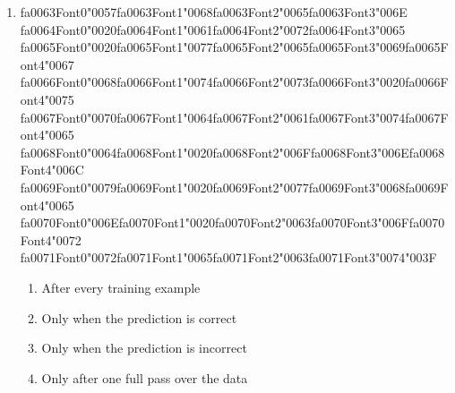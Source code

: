 \documentclass[12pt]{article}
\begin{document}
\begin{enumerate}[label=Q\arabic*.]
\item {\csname fa0063Font0\endcsname\char"0057}{\csname fa0063Font1\endcsname\char"0068}{\csname fa0063Font2\endcsname\char"0065}{\csname fa0063Font3\endcsname\char"006E} {\csname fa0064Font0\endcsname\char"0020}{\csname fa0064Font1\endcsname\char"0061}{\csname fa0064Font2\endcsname\char"0072}{\csname fa0064Font3\endcsname\char"0065} {\csname fa0065Font0\endcsname\char"0020}{\csname fa0065Font1\endcsname\char"0077}{\csname fa0065Font2\endcsname\char"0065}{\csname fa0065Font3\endcsname\char"0069}{\csname fa0065Font4\endcsname\char"0067} {\csname fa0066Font0\endcsname\char"0068}{\csname fa0066Font1\endcsname\char"0074}{\csname fa0066Font2\endcsname\char"0073}{\csname fa0066Font3\endcsname\char"0020}{\csname fa0066Font4\endcsname\char"0075} {\csname fa0067Font0\endcsname\char"0070}{\csname fa0067Font1\endcsname\char"0064}{\csname fa0067Font2\endcsname\char"0061}{\csname fa0067Font3\endcsname\char"0074}{\csname fa0067Font4\endcsname\char"0065} {\csname fa0068Font0\endcsname\char"0064}{\csname fa0068Font1\endcsname\char"0020}{\csname fa0068Font2\endcsname\char"006F}{\csname fa0068Font3\endcsname\char"006E}{\csname fa0068Font4\endcsname\char"006C} {\csname fa0069Font0\endcsname\char"0079}{\csname fa0069Font1\endcsname\char"0020}{\csname fa0069Font2\endcsname\char"0077}{\csname fa0069Font3\endcsname\char"0068}{\csname fa0069Font4\endcsname\char"0065} {\csname fa0070Font0\endcsname\char"006E}{\csname fa0070Font1\endcsname\char"0020}{\csname fa0070Font2\endcsname\char"0063}{\csname fa0070Font3\endcsname\char"006F}{\csname fa0070Font4\endcsname\char"0072} {\csname fa0071Font0\endcsname\char"0072}{\csname fa0071Font1\endcsname\char"0065}{\csname fa0071Font2\endcsname\char"0063}{\csname fa0071Font3\endcsname\char"0074}{\char"003F}
\begin{enumerate}[label=(\Alph*)]
    \item After every training example
    \item Only when the prediction is correct
    \item Only when the prediction is incorrect
    \item Only after one full pass over the data
\end{enumerate}

\end{enumerate}
\end{document}
